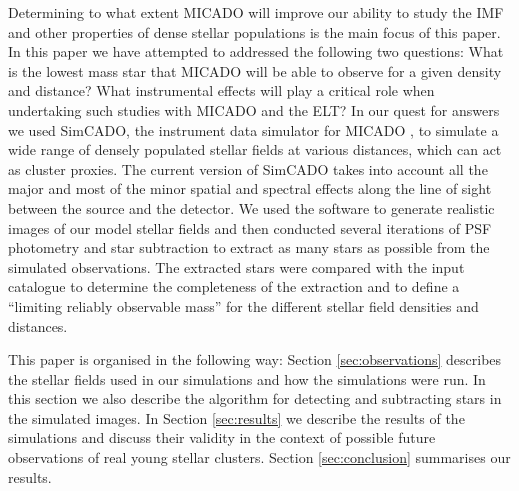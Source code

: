 Determining to what extent MICADO will improve our ability to study the IMF and other properties of dense stellar populations is the main focus of this paper. In this paper we have attempted to addressed the following two questions: What is the lowest mass star that MICADO will be able to observe for a given density and distance? What instrumental effects will play a critical role when undertaking such studies with MICADO and the ELT?
In our quest for answers we used SimCADO, the instrument data simulator for MICADO \citep{leschinski2016}, to simulate a wide range of densely populated stellar fields at various distances, which can act as cluster proxies. The current version of SimCADO takes into account all the major and most of the minor spatial and spectral effects along the line of sight between the source and the detector. We used the software to generate realistic images of our model stellar fields and then conducted several iterations of PSF photometry and star subtraction to extract as many stars as possible from the simulated observations. The extracted stars were compared with the input catalogue to determine the completeness of the extraction and to define a ``limiting reliably observable mass'' for the different stellar field densities and distances.

This paper is organised in the following way: Section \ref{sec:observations} describes the stellar fields used in our simulations and how the simulations were run. In this section we also describe the algorithm for detecting and subtracting stars in the simulated images. In Section \ref{sec:results} we describe the results of the simulations and discuss their validity in the context of possible future observations of real young stellar clusters. Section \ref{sec:conclusion} summarises our results.


